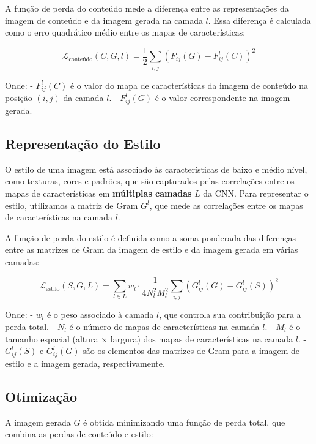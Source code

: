 \documentclass{tufte-handout}
\begin{document}
A função de perda do conteúdo mede a diferença entre as representações da imagem de conteúdo e da imagem gerada na camada $l$. Essa diferença é calculada como o erro quadrático médio entre os mapas de características:

\begin{equation}
    \mathcal{L}_{\text{conteúdo}} (C, G, l) = \frac{1}{2} \sum_{i,j} \left(F_{ij}^l(G) - F_{ij}^l(C)\right)^2
\end{equation}

Onde:
- $F_{ij}^l(C)$ é o valor do mapa de características da imagem de conteúdo na posição $(i,j)$ da camada $l$.
- $F_{ij}^l(G)$ é o valor correspondente na imagem gerada.

\subsection{Representação do Estilo}

O estilo de uma imagem está associado às características de baixo e médio nível, como texturas, cores e padrões, que são capturados pelas correlações entre os mapas de características em \textbf{múltiplas camadas} $L$ da CNN. Para representar o estilo, utilizamos a matriz de Gram $G^l$, que mede as correlações entre os mapas de características na camada $l$.

A função de perda do estilo é definida como a soma ponderada das diferenças entre as matrizes de Gram da imagem de estilo e da imagem gerada em várias camadas:

\begin{equation}
    \mathcal{L}_{\text{estilo}} (S, G, L) = \sum_{l \in L} w_l \cdot \frac{1}{4N_l^2 M_l^2} \sum_{i,j} \left(G^l_{ij}(G) - G^l_{ij}(S)\right)^2
\end{equation}

Onde:
- $w_l$ é o peso associado à camada $l$, que controla sua contribuição para a perda total.
- $N_l$ é o número de mapas de características na camada $l$.
- $M_l$ é o tamanho espacial (altura $\times$ largura) dos mapas de características na camada $l$.
- $G^l_{ij}(S)$ e $G^l_{ij}(G)$ são os elementos das matrizes de Gram para a imagem de estilo e a imagem gerada, respectivamente.

\subsection{Otimização}

A imagem gerada $G$ é obtida minimizando uma função de perda total, que combina as perdas de conteúdo e estilo:
\end{document}
